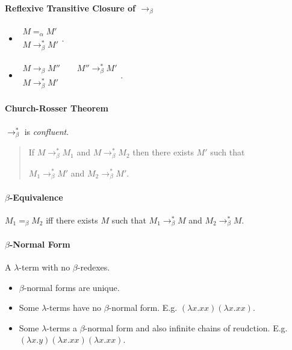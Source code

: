 \documentclass[twocolumn,english]{article}
\begin{document}
\paragraph{Reflexive Transitive Closure of $\rightarrow_{\beta}$}
\begin{itemize}
\item $\begin{array}{c}
M=_{\alpha}M'\\
\hline M\rightarrow_{\beta}^{*}M'
\end{array}$.
\item $\begin{array}{c}
M\rightarrow_{\beta}M''\qquad M''\rightarrow_{\beta}^{*}M'\\
\hline M\rightarrow_{\beta}^{*}M'
\end{array}$.
\end{itemize}

\paragraph{Church-Rosser Theorem}

$\rightarrow_{\beta}^{*}$ is \emph{confluent}.
\begin{quotation}
If $M\rightarrow_{\beta}^{*}M_{1}$ and $M\rightarrow_{\beta}^{*}M_{2}$
then there exists $M'$ such that

$M_{1}\rightarrow_{\beta}^{*}M'$ and $M_{2}\rightarrow_{\beta}^{*}M'$.
\end{quotation}

\paragraph{$\beta$-Equivalence}

$M_{1}=_{\beta}M_{2}$ iff there exists $M$ such that $M_{1}\rightarrow_{\beta}^{*}M$
and $M_{2}\rightarrow_{\beta}^{*}M$.

\paragraph{$\beta$-Normal Form}

A $\lambda$-term with no $\beta$-redexes.
\begin{itemize}
\item $\beta$-normal forms are unique.
\item Some $\lambda$-terms have no $\beta$-normal form. E.g. $\left(\lambda x.xx\right)\left(\lambda x.xx\right)$.
\item Some $\lambda$-terms a $\beta$-normal form and also infinite chains
of reudction. E.g. $\left(\lambda x.y\right)\left(\lambda x.xx\right)\left(\lambda x.xx\right)$.
\end{itemize}
\end{document}
